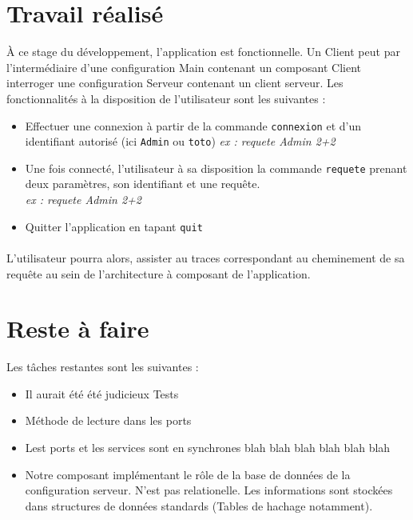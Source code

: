 \documentclass[12pt]{article}
\begin{document}
\section{Travail réalisé}
À ce stage du développement, l'application est fonctionnelle. Un Client peut par l'intermédiaire d'une configuration \og Main \fg{} contenant un composant Client interroger une configuration Serveur contenant un client serveur. Les fonctionnalités à la disposition de l'utilisateur sont les suivantes :
\begin{itemize}
\item
  Effectuer une connexion à partir de la commande \verb+connexion+ et d'un identifiant autorisé (ici \verb+Admin+ ou \verb+toto+)
  \emph{ex : requete Admin 2+2}
\item
  Une fois connecté, l'utilisateur à sa disposition la commande \verb+requete+ prenant deux paramètres, son identifiant et une requête.  \hfill \\ 
  \emph{ex : requete Admin 2+2}
\item
  Quitter l'application en tapant \verb+quit+
\end{itemize}
\paragraph{}

L'utilisateur pourra alors, assister au traces correspondant au cheminement de sa requête au sein de l'architecture à composant de l'application.


\section{Reste à faire}
Les tâches restantes sont les suivantes : 

\begin{itemize}
\item
  Il aurait été été judicieux Tests
\item
  Méthode de lecture dans les ports
\item
 Lest ports et les services sont en synchrones blah blah blah  blah blah blah 
\item
  Notre composant implémentant le rôle de la base de données de la configuration serveur. N'est pas relationelle. Les informations sont stockées dans structures de données standards (Tables de hachage notamment).
 
  
\end{itemize}
\end{document}
